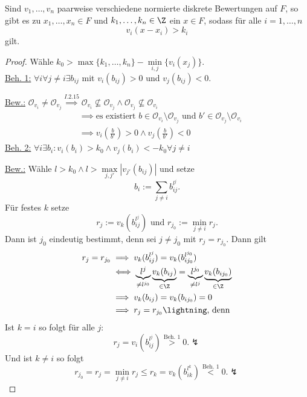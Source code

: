\begin{theorem}
    Sind $v_1,\ldots,v_n$ paarweise verschiedene normierte diskrete Bewertungen auf $F$, so gibt es zu 
    $x_1,\ldots,x_n \in F$ und $k_1, \ldots,k_n \in \Z$ ein $x \in F$, sodass für alle $i = 1, \ldots,n$
    $$ v_i(x - x_i) > k_i$$
    gilt.  
\end{theorem}
\begin{proof}
    Wähle $k_0 > \max\{k_1, \ldots, k_n\} - \min\limits_{i,j}\{v_i(x_j)\}$.\\
    \underline{Beh. 1:} $\forall i \forall j\ne i \exists b_{ij}$ mit $v_i(b_{ij}) > 0$ und $v_j(b_{ij}) < 0$.

    \underline{Bew.:} $\mathcal{O}_{v_i} \ne \mathcal{O}_{v_j} \stackrel{I.2.15}{\implies} \mathcal{O}_{v_i} \not \subseteq \mathcal{O}_{v_j}
    \land \mathcal{O}_{v_j} \not \subseteq \mathcal{O}_{v_i}$ 
    \begin{align*}
        & \implies \text{es existiert } b \in \mathcal{O}_{v_i} \setminus \mathcal{O}_{v_j} \text{ und } b' \in \mathcal{O}_{v_j} \setminus \mathcal{O}_{v_i}\\
        & \implies v_i(\frac{b}{b'}) > 0 \land v_j(\frac{b}{b'}) < 0
    \end{align*}
    \underline{Beh. 2:} $\forall i \exists b_i: v_i(b_i) > k_0 \land v_j(b_i) < -k_0 \forall j \ne i$

    \underline{Bew.:} Wähle $l > k_0 \land l > \max\limits_{j,j'}|v_{j'}(b_{ij})|$ und setze
    $$ b_i := \sum\limits_{j \ne i} b_{ij}^{l^j}.$$
    Für festes $k$ setze $$ r_j := v_k(b_{ij}^{l^j}) \text{ und } r_{j_0} := \min\limits_{j \ne i} r_j.$$
    Dann ist $j_0$ eindeutig bestimmt, denn sei $j \ne j_0$ mit $r_j = r_{j_0}$. Dann gilt
    \begin{align*}
        r_j = r_{j_0} & \implies v_k(b_{ij}^{l^j}) = v_k(b_{ij_0}^{l^{j_0}})\\
            & \iff \underbrace{l^j}_{\ne l^{j_0}}\underbrace{v_k(b_{ij})}_{\in \Z} = \underbrace{l^{j_0}}_{\ne l^j}\underbrace{v_k(b_{ij_0})}_{\in \Z} \\
            & \implies v_k(b_{ij}) = v_k(b_{ij_0}) = 0\\
            & \implies r_j = r_{j_0} \lightning \text{, denn}
    \end{align*}
    Ist $k = i$ so folgt für alle $j$:
    $$ r_j = v_i(b_{ij}^{l^j}) \stackrel{\text{Beh. 1}}{>} 0. \lightning $$
    Und ist $k \ne i$ so folgt
    $$ r_{j_0} = r_j = \min_{j \ne i} r_j \leq r_k = v_k(b_{ik}^{l^k}) \stackrel{\text{Beh. 1}}{<} 0. \lightning$$


\end{proof}
